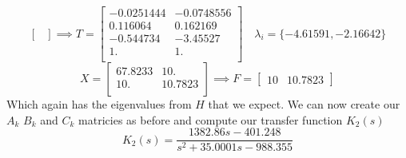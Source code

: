 \documentclass{article}
\begin{document}
\begin{enumerate}[(a)]
\begin{enumerate}[(a)]
$$\begin{bmatrix}
\end{bmatrix}
\implies
T =
\begin{bmatrix}
-0.0251444 & -0.0748556 \\
0.116064 & 0.162169 \\
-0.544734 & -3.45527 \\
1. & 1. \\
\end{bmatrix}
\quad \lambda_i = \{-4.61591, -2.16642\}
$$
$$
X =
\begin{bmatrix}
67.8233 & 10. \\
10. & 10.7823 \\
\end{bmatrix}
\implies
F = \begin{bmatrix} 10 & 10.7823 \end{bmatrix}
$$
Which again has the eigenvalues from $H$ that we expect.
We can now create our $A_k$ $B_k$ and $C_k$ matricies as before and compute our transfer function $K_2(s)$
$$ K_2(s) = \frac{1382.86 s-401.248}{s^2+35.0001 s-988.355} $$


\end{enumerate}
\end{enumerate}
\end{document}
